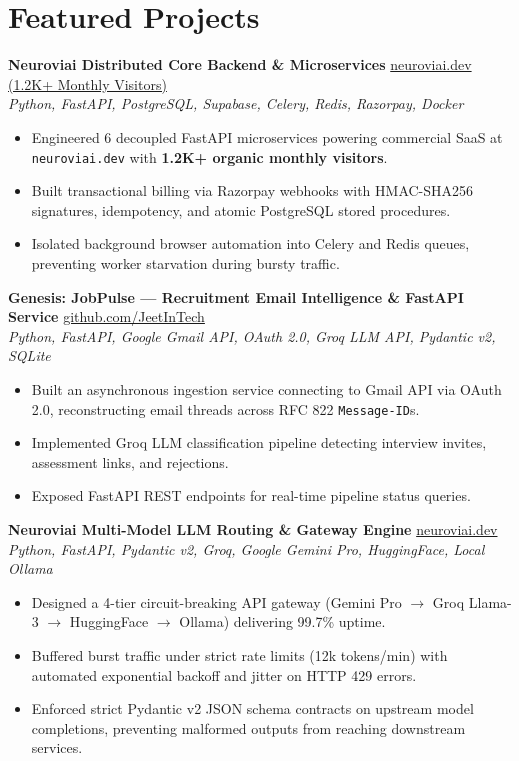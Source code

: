 \documentclass[10pt]{article}
\begin{document}
\section*{Featured Projects}
\textbf{Neuroviai Distributed Core Backend \& Microservices} \hfill \href{https://neuroviai.dev}{neuroviai.dev (1.2K+ Monthly Visitors)} \\
\textit{Python, FastAPI, PostgreSQL, Supabase, Celery, Redis, Razorpay, Docker}
\begin{itemize}
    \item Engineered 6 decoupled FastAPI microservices powering commercial SaaS at \texttt{neuroviai.dev} with \textbf{1.2K+ organic monthly visitors}.
    \item Built transactional billing via Razorpay webhooks with HMAC-SHA256 signatures, idempotency, and atomic PostgreSQL stored procedures.
    \item Isolated background browser automation into Celery and Redis queues, preventing worker starvation during bursty traffic.
\end{itemize}

\vspace{1.5pt}
\textbf{Genesis: JobPulse — Recruitment Email Intelligence \& FastAPI Service} \hfill \href{https://github.com/JeetInTech}{github.com/JeetInTech} \\
\textit{Python, FastAPI, Google Gmail API, OAuth 2.0, Groq LLM API, Pydantic v2, SQLite}
\begin{itemize}
    \item Built an asynchronous ingestion service connecting to Gmail API via OAuth 2.0, reconstructing email threads across RFC 822 \texttt{Message-ID}s.
    \item Implemented Groq LLM classification pipeline detecting interview invites, assessment links, and rejections.
    \item Exposed FastAPI REST endpoints for real-time pipeline status queries.
\end{itemize}

\vspace{1.5pt}
\textbf{Neuroviai Multi-Model LLM Routing \& Gateway Engine} \hfill \href{https://neuroviai.dev}{neuroviai.dev} \\
\textit{Python, FastAPI, Pydantic v2, Groq, Google Gemini Pro, HuggingFace, Local Ollama}
\begin{itemize}
    \item Designed a 4-tier circuit-breaking API gateway (Gemini Pro $\to$ Groq Llama-3 $\to$ HuggingFace $\to$ Ollama) delivering 99.7\% uptime.
    \item Buffered burst traffic under strict rate limits (12k tokens/min) with automated exponential backoff and jitter on HTTP 429 errors.
    \item Enforced strict Pydantic v2 JSON schema contracts on upstream model completions, preventing malformed outputs from reaching downstream services.
\end{itemize}
\end{document}
